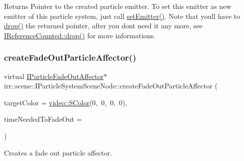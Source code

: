 \begin{DoxyReturn}{Returns}
Pointer to the created particle emitter. To set this emitter as new emitter of this particle system, just call \hyperlink{classirr_1_1scene_1_1IParticleSystemSceneNode_aececff4531482ce976f1859c40bf3f76}{set\+Emitter()}. Note that you\textquotesingle{}ll have to \hyperlink{classirr_1_1IReferenceCounted_a03856a09355b89d178090c4a5f738543}{drop()} the returned pointer, after you don\textquotesingle{}t need it any more, see \hyperlink{classirr_1_1IReferenceCounted_a03856a09355b89d178090c4a5f738543}{I\+Reference\+Counted\+::drop()} for more informations. 
\end{DoxyReturn}
\mbox{\label{classirr_1_1scene_1_1IParticleSystemSceneNode_a4a9c3ecdf6118267f312f9389bb24888}} 
\subsubsection{\texorpdfstring{create\+Fade\+Out\+Particle\+Affector()}{createFadeOutParticleAffector()}}
{\footnotesize\ttfamily virtual \hyperlink{classirr_1_1scene_1_1IParticleFadeOutAffector}{I\+Particle\+Fade\+Out\+Affector}$\ast$ irr\+::scene\+::\+I\+Particle\+System\+Scene\+Node\+::create\+Fade\+Out\+Particle\+Affector (\begin{DoxyParamCaption}\item[{const \hyperlink{classirr_1_1video_1_1SColor}{video\+::\+S\+Color} \&}]{target\+Color = {\ttfamily \hyperlink{classirr_1_1video_1_1SColor}{video\+::\+S\+Color}(0,~0,~0,~0)},  }\item[{\hyperlink{namespaceirr_a0416a53257075833e7002efd0a18e804}{u32}}]{time\+Needed\+To\+Fade\+Out = {} }\end{DoxyParamCaption})\hspace{0.3cm}{\ttfamily [pure virtual]}}



Creates a fade out particle affector. 

